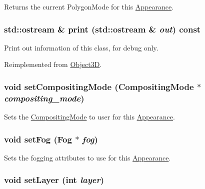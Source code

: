 Returns the current PolygonMode for this \hyperlink{classm3g_1_1Appearance}{Appearance}. \hypertarget{classm3g_1_1Appearance_6fea17fa1532df3794f8cb39cb4f911f}{
\subsubsection[{print}]{\setlength{\rightskip}{0pt plus 5cm}std::ostream \& print (std::ostream \& {\em out}) const}}
\label{classm3g_1_1Appearance_6fea17fa1532df3794f8cb39cb4f911f}


Print out information of this class, for debug only. 

Reimplemented from \hyperlink{classm3g_1_1Object3D_6fea17fa1532df3794f8cb39cb4f911f}{Object3D}.\hypertarget{classm3g_1_1Appearance_8f9514f1c01268fff95b7c31f3a194b6}{
\subsubsection[{setCompositingMode}]{\setlength{\rightskip}{0pt plus 5cm}void setCompositingMode ({\bf CompositingMode} $\ast$ {\em compositing\_\-mode})}}
\label{classm3g_1_1Appearance_8f9514f1c01268fff95b7c31f3a194b6}


Sets the \hyperlink{classm3g_1_1CompositingMode}{CompositingMode} to user for this \hyperlink{classm3g_1_1Appearance}{Appearance}. \hypertarget{classm3g_1_1Appearance_bc1a612006d6b4c3d443ff6ab542c788}{
\subsubsection[{setFog}]{\setlength{\rightskip}{0pt plus 5cm}void setFog ({\bf Fog} $\ast$ {\em fog})}}
\label{classm3g_1_1Appearance_bc1a612006d6b4c3d443ff6ab542c788}


Sets the fogging attributes to use for this \hyperlink{classm3g_1_1Appearance}{Appearance}. \hypertarget{classm3g_1_1Appearance_fbd2fbd594c8ee140b028f505631f682}{
\subsubsection[{setLayer}]{\setlength{\rightskip}{0pt plus 5cm}void setLayer (int {\em layer})}}
\label{classm3g_1_1Appearance_fbd2fbd594c8ee140b028f505631f682}


